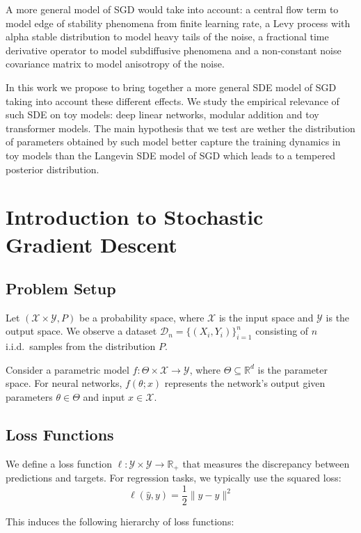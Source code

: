 \documentclass[11pt]{article}
\begin{document}
A more general model of SGD would take into account: a central flow term to model edge of stability phenomena from finite learning rate, a Levy process with alpha stable distribution to model heavy tails of the noise, a fractional time derivative operator to model subdiffusive phenomena and a non-constant noise covariance matrix to model anisotropy of the noise.

In this work we propose to bring together a more general SDE model of SGD taking into account these different effects. We study the empirical relevance of such SDE on toy models: deep linear networks, modular addition and toy transformer models. The main hypothesis that we test are wether the distribution of parameters obtained by such model better capture the training dynamics in toy models than the Langevin SDE model of SGD which leads to a tempered posterior distribution.


\section{Introduction to Stochastic Gradient Descent}

\subsection{Problem Setup}

Let $(\mathcal{X} \times \mathcal{Y}, P)$ be a probability space, where $\mathcal{X}$ is the input space and $\mathcal{Y}$ is the output space. We observe a dataset $\mathcal{D}_n = \{(X_i, Y_i)\}_{i=1}^n$ consisting of $n$ i.i.d.\ samples from the distribution $P$.

Consider a parametric model $f: \Theta \times \mathcal{X} \to \mathcal{Y}$, where $\Theta \subseteq \mathbb{R}^d$ is the parameter space. For neural networks, $f(\theta; x)$ represents the network's output given parameters $\theta \in \Theta$ and input $x \in \mathcal{X}$.

\subsection{Loss Functions}

We define a loss function $\ell: \mathcal{Y} \times \mathcal{Y} \to \mathbb{R}_+$ that measures the discrepancy between predictions and targets. For regression tasks, we typically use the squared loss:
$$\ell(\hat{y}, y) = \frac{1}{2}\|\hat{y} - y\|^2$$

This induces the following hierarchy of loss functions:
\end{document}
